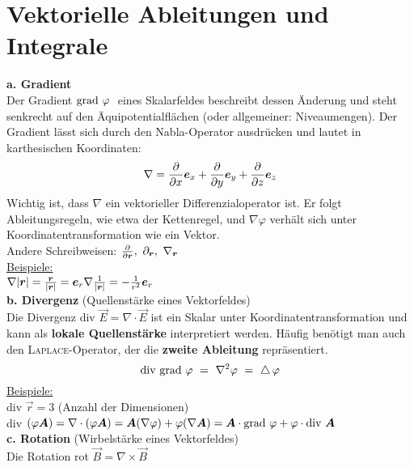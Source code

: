 \section{Vektorielle Ableitungen und Integrale}
\textbf{a. Gradient}\\
\linebreak
Der Gradient $\grad\varphi\ $ eines Skalarfeldes beschreibt dessen Änderung und steht senkrecht auf den Äquipotentialflächen (oder allgemeiner: Niveaumengen). Der Gradient lässt sich durch den Nabla-Operator ausdrücken und lautet in karthesischen Koordinaten: 
\begin{equation*}
\nabla=\pdiff{}{x}\vec{e}_x+\pdiff{}{y}\vec{e}_y+\pdiff{}{z}\vec{e}_z
\end{equation*}
Wichtig ist, dass $\nabla$ ein vektorieller Differenzialoperator ist. Er folgt Ableitungsregeln, wie etwa der Kettenregel, und $\nabla\varphi$ verhält sich unter Koordinatentransformation wie ein Vektor.\\
\linebreak
Andere Schreibweisen: $\pdiff{}{\vec{r}},\ \partial_{\vec{r}},\ \nabla_{\vec{r}}$\\
\linebreak
\underline{Beispiele:}\\
\linebreak
$\nabla |\vec{r}|=\frac{\vec{r}}{|\vec{r}|}=\vec{e}_r\\
\nabla \frac{1}{|\vec{r}|}=-\frac{1}{r^2}\vec{e}_r$\\
\linebreak\linebreak
\textbf{b. Divergenz} (Quellenstärke eines Vektorfeldes)\\
\linebreak
Die Divergenz div $\vec{E}=\nabla\cdot\vec{E}$ ist ein Skalar unter Koordinatentransformation und kann als \textbf{lokale Quellenstärke} interpretiert werden. Häufig benötigt man auch den \textsc{Laplace}-Operator, der die \textbf{zweite Ableitung} repräsentiert.\\
\begin{equation*}
\div\grad \varphi \ = \ \nabla^2\varphi \ = \ \laplace\varphi
\end{equation*}
\underline{Beispiele:}\\
\linebreak
div $\vec{r}=3$ (Anzahl der Dimensionen)\\
div $(\varphi\vec{A})=\nabla\cdot(\varphi\vec{A})=\vec{A}(\nabla\varphi)+\varphi(\nabla\vec{A})=\vec{A}\cdot\grad \varphi+\varphi\cdot\div\vec{A}$\\
\linebreak
\textbf{c. Rotation} (Wirbelstärke eines Vektorfeldes)\\
\linebreak
Die Rotation rot $\vec{B}=\nabla\times\vec{B}$

